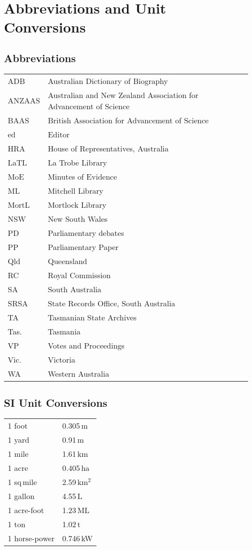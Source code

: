 
\chapter{Abbreviations and Unit Conversions}
\label{ch:abbrev}

{\small 

\section*{Abbreviations} 

\begin{tabular}{ll}
	ADB	& Australian Dictionary of Biography\\
	ANZAAS	& Australian and New Zealand Association for Advancement of
                              Science\\
       	BAAS	& British Association for Advancement of Science\\
	ed	& Editor\\
	HRA	& House of Representatives, Australia\\
	LaTL	& La Trobe Library\\
	MoE	& Minutes of Evidence\\
	ML	& Mitchell Library\\
	MortL	& Mortlock Library\\
	NSW	& New South Wales\\
	PD	& Parliamentary debates\\
	PP	& Parliamentary Paper\\
	Qld	& Queensland\\
	RC	& Royal Commission\\
	SA	& South Australia\\
	SRSA	& State Records Office, South Australia\\
	TA	& Tasmanian State Archives\\
	Tas.	& Tasmania\\
	VP	& Votes and Proceedings\\
	Vic.	& Victoria\\
	WA	& Western Australia\\
\end{tabular}

\section*{SI Unit Conversions}

\begin{tabular}{ll}
	1 foot		& 0.305\,m \\
	1 yard		& 0.91\,m  \\
	1 mile		& 1.61\,km \\
	1 acre		& 0.405\,ha \\
	1 sq\,mile	& 2.59\,km$^2$ \\
	1 gallon	& 4.55\,L \\
	1 acre-foot	& 1.23\,ML \\
	1 ton		& 1.02\,t \\
	1 horse-power	& 0.746\,kW \\
\end{tabular}

}
